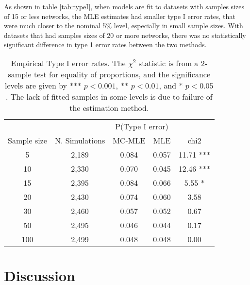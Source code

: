 \documentclass[review]{elsarticle}
\begin{document}
As shown in table \autoref{tab:typeI}, when models are fit to datasets with samples sizes of 15 or less networks, the MLE estimates had smaller type I error rates, that were much closer to the nominal 5\% level, especially in small sample sizes. With datasets that had samples sizes of 20 or more networks, there was no statistically significant difference in type 1 error rates between the two methods.

\begin{table*}[ht]
	\centering
	\begin{tabular}{ccccc}
		\toprule & & \multicolumn{2}{c}{P(Type I error)} \\ \cmidrule(r){3-4}
		Sample size & N. Simulations & MC-MLE & MLE & chi2 \\ 
		\midrule
		5 & 2,189 & 0.084 & 0.057 & 11.71 *** \\ 
		10 & 2,330 & 0.070 & 0.045 & 12.46 *** \\ 
		15 & 2,395 & 0.084 & 0.066 & 5.55 * \\ 
		20 & 2,430 & 0.074 & 0.060 & 3.58  \\ 
		30 & 2,460 & 0.057 & 0.052 & 0.67  \\ 
		50 & 2,495 & 0.046 & 0.044 & 0.17  \\ 
		100 & 2,499 & 0.048 & 0.048 & 0.00  \\ 
		\bottomrule
	\end{tabular}
	\caption{\label{tab:typeI}Empirical Type I error rates. The $\chi^2$ statistic is from a 2-sample test for equality of proportions, and the significance levels are given by *** $p < 0.001$, ** $p < 0.01$, and * $p < 0.05$. The lack of fitted samples in some levels is due to failure of the estimation method.} 
\end{table*}


\section{Discussion}
\end{document}
